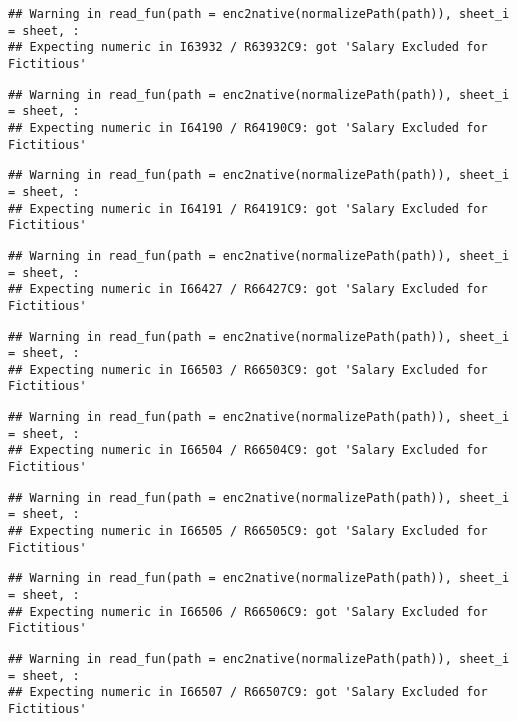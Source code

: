 \documentclass[
]{article}
\begin{document}
\begin{verbatim}
## Warning in read_fun(path = enc2native(normalizePath(path)), sheet_i = sheet, :
## Expecting numeric in I63932 / R63932C9: got 'Salary Excluded for Fictitious'
\end{verbatim}

\begin{verbatim}
## Warning in read_fun(path = enc2native(normalizePath(path)), sheet_i = sheet, :
## Expecting numeric in I64190 / R64190C9: got 'Salary Excluded for Fictitious'
\end{verbatim}

\begin{verbatim}
## Warning in read_fun(path = enc2native(normalizePath(path)), sheet_i = sheet, :
## Expecting numeric in I64191 / R64191C9: got 'Salary Excluded for Fictitious'
\end{verbatim}

\begin{verbatim}
## Warning in read_fun(path = enc2native(normalizePath(path)), sheet_i = sheet, :
## Expecting numeric in I66427 / R66427C9: got 'Salary Excluded for Fictitious'
\end{verbatim}

\begin{verbatim}
## Warning in read_fun(path = enc2native(normalizePath(path)), sheet_i = sheet, :
## Expecting numeric in I66503 / R66503C9: got 'Salary Excluded for Fictitious'
\end{verbatim}

\begin{verbatim}
## Warning in read_fun(path = enc2native(normalizePath(path)), sheet_i = sheet, :
## Expecting numeric in I66504 / R66504C9: got 'Salary Excluded for Fictitious'
\end{verbatim}

\begin{verbatim}
## Warning in read_fun(path = enc2native(normalizePath(path)), sheet_i = sheet, :
## Expecting numeric in I66505 / R66505C9: got 'Salary Excluded for Fictitious'
\end{verbatim}

\begin{verbatim}
## Warning in read_fun(path = enc2native(normalizePath(path)), sheet_i = sheet, :
## Expecting numeric in I66506 / R66506C9: got 'Salary Excluded for Fictitious'
\end{verbatim}

\begin{verbatim}
## Warning in read_fun(path = enc2native(normalizePath(path)), sheet_i = sheet, :
## Expecting numeric in I66507 / R66507C9: got 'Salary Excluded for Fictitious'
\end{verbatim}
\end{document}
